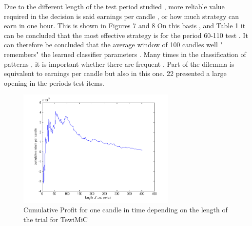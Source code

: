 \documentclass{tewiart}
\begin{document}
Due to the different length of the test period studied , more reliable value required in the decision is said earnings per candle , 
or how much strategy can earn in one hour. This is shown in Figures 7 and 8 On this basis , and Table 1 it can be concluded that the
 most effective strategy is for the period 60-110 test .
It can therefore be concluded that the average window of 100 candles well " remembers" the learned classifier parameters . 
Many times in the classification of patterns , it is important whether there are frequent . 
Part of the dilemma is equivalent to earnings per candle but also in this one. 22 presented a large opening in
 the periods test items.\\

\begin{figure}[h!]
\begin{center}
\includegraphics[width=0.7\textwidth]{pictures/mic_percandle_end.png}
\caption{Cumulative Profit for one candle in time depending on the length of the trial for TewiMiC}
\label{Cum3DPerCMiCend}
\end{center}
\end{figure}
\FloatBarrier
\end{document}
